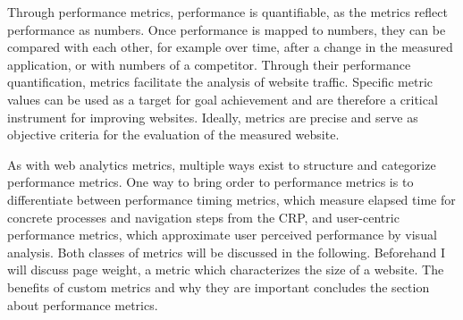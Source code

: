 
Through performance metrics, performance is quantifiable, as the metrics reflect performance as numbers.
Once performance is mapped to numbers, they can be compared with each other, for example over time, after a change in the measured application,  or with numbers of a competitor. %
Through their performance quantification, metrics facilitate the analysis of website traffic.
Specific metric values can be used as a target for goal achievement and are therefore a critical instrument for improving websites. %
Ideally, metrics are precise and serve as objective criteria for the evaluation of the measured website. %



As with web analytics metrics, multiple ways exist to structure and categorize performance metrics.
One way to bring order to performance metrics is to differentiate between performance timing metrics, which measure elapsed time for concrete processes and navigation steps from the CRP, and user-centric performance metrics, which approximate user perceived performance by visual analysis.
Both classes of metrics will be discussed in the following.
Beforehand I will discuss page weight, a metric which characterizes the size of a website.
The benefits of custom metrics and why they are important concludes the section about performance metrics.











